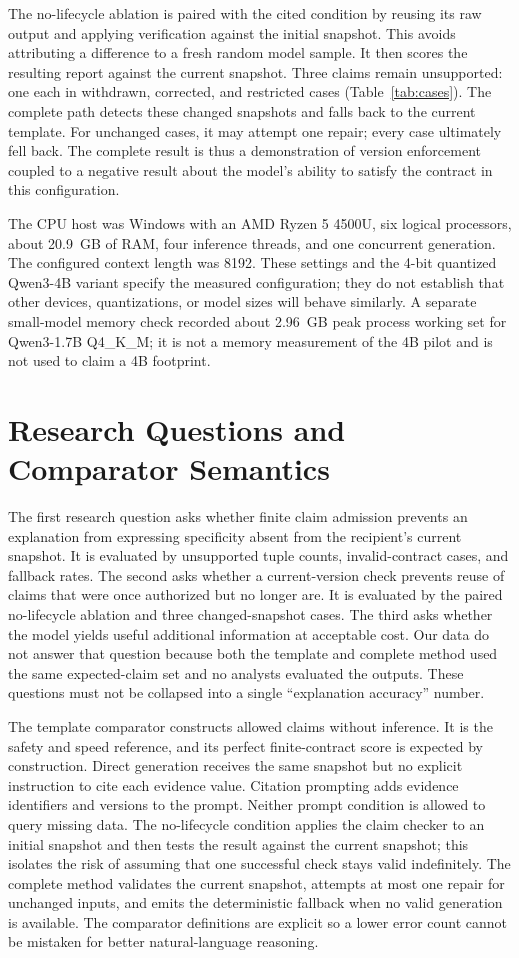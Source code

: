 The no-lifecycle ablation is paired with the cited condition by reusing its raw output and applying verification against the initial snapshot. This avoids attributing a difference to a fresh random model sample. It then scores the resulting report against the current snapshot. Three claims remain unsupported: one each in withdrawn, corrected, and restricted cases (Table~\ref{tab:cases}). The complete path detects these changed snapshots and falls back to the current template. For unchanged cases, it may attempt one repair; every case ultimately fell back. The complete result is thus a demonstration of version enforcement coupled to a negative result about the model's ability to satisfy the contract in this configuration.

The CPU host was Windows with an AMD Ryzen 5 4500U, six logical processors, about 20.9~GB of RAM, four inference threads, and one concurrent generation. The configured context length was 8192. These settings and the 4-bit quantized Qwen3-4B variant specify the measured configuration; they do not establish that other devices, quantizations, or model sizes will behave similarly. A separate small-model memory check recorded about 2.96~GB peak process working set for Qwen3-1.7B Q4\_K\_M; it is not a memory measurement of the 4B pilot and is not used to claim a 4B footprint.

\section{Research Questions and Comparator Semantics}
The first research question asks whether finite claim admission prevents an explanation from expressing specificity absent from the recipient's current snapshot. It is evaluated by unsupported tuple counts, invalid-contract cases, and fallback rates. The second asks whether a current-version check prevents reuse of claims that were once authorized but no longer are. It is evaluated by the paired no-lifecycle ablation and three changed-snapshot cases. The third asks whether the model yields useful additional information at acceptable cost. Our data do not answer that question because both the template and complete method used the same expected-claim set and no analysts evaluated the outputs. These questions must not be collapsed into a single ``explanation accuracy'' number.

The template comparator constructs allowed claims without inference. It is the safety and speed reference, and its perfect finite-contract score is expected by construction. Direct generation receives the same snapshot but no explicit instruction to cite each evidence value. Citation prompting adds evidence identifiers and versions to the prompt. Neither prompt condition is allowed to query missing data. The no-lifecycle condition applies the claim checker to an initial snapshot and then tests the result against the current snapshot; this isolates the risk of assuming that one successful check stays valid indefinitely. The complete method validates the current snapshot, attempts at most one repair for unchanged inputs, and emits the deterministic fallback when no valid generation is available. The comparator definitions are explicit so a lower error count cannot be mistaken for better natural-language reasoning.

